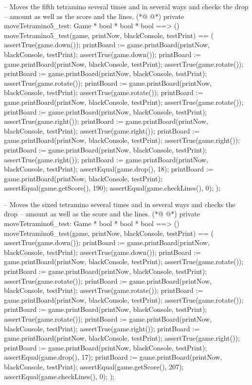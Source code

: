 \begin{vdmpp}[breaklines=true]
  -- Moves the fifth tetramino several times and in several ways and checks the drop
  -- amount as well as the score and the lines.
(*@
\label{moveTetramino5:test:394}
@*)
  private moveTetramino5_test: Game * bool * bool * bool ==> ()
  moveTetramino5_test(game, printNow, blackConsole, testPrint) == (
   assertTrue(game.down());
   printBoard := game.printBoard(printNow, blackConsole, testPrint);
   assertTrue(game.down());
   printBoard := game.printBoard(printNow, blackConsole, testPrint);
   assertTrue(game.rotate());
   printBoard := game.printBoard(printNow, blackConsole, testPrint);
   assertTrue(game.rotate());
   printBoard := game.printBoard(printNow, blackConsole, testPrint);
   assertTrue(game.rotate());
   printBoard := game.printBoard(printNow, blackConsole, testPrint);
   assertTrue(game.rotate());
   printBoard := game.printBoard(printNow, blackConsole, testPrint);
   assertTrue(game.right());
   printBoard := game.printBoard(printNow, blackConsole, testPrint);
   assertTrue(game.right());
   printBoard := game.printBoard(printNow, blackConsole, testPrint);
   assertTrue(game.right());
   printBoard := game.printBoard(printNow, blackConsole, testPrint);
   assertTrue(game.right());
   printBoard := game.printBoard(printNow, blackConsole, testPrint);
   assertEqual(game.drop(), 18);
   printBoard := game.printBoard(printNow, blackConsole, testPrint);
   assertEqual(game.getScore(), 190);
   assertEqual(game.checkLines(), 0);
  );
  
  -- Moves the sixed tetramino several times and in several ways and checks the drop
  -- amount as well as the score and the lines.
(*@
\label{moveTetramino6:test:424}
@*)
  private moveTetramino6_test: Game * bool * bool * bool ==> ()
  moveTetramino6_test(game, printNow, blackConsole, testPrint) == (
   assertTrue(game.down());
   printBoard := game.printBoard(printNow, blackConsole, testPrint);
   assertTrue(game.down());
   printBoard := game.printBoard(printNow, blackConsole, testPrint);
   assertTrue(game.rotate());
   printBoard := game.printBoard(printNow, blackConsole, testPrint);
   assertTrue(game.rotate());
   printBoard := game.printBoard(printNow, blackConsole, testPrint);
   assertTrue(game.rotate());
   printBoard := game.printBoard(printNow, blackConsole, testPrint);
   assertTrue(game.rotate());
   printBoard := game.printBoard(printNow, blackConsole, testPrint);
   assertTrue(game.rotate());
   printBoard := game.printBoard(printNow, blackConsole, testPrint);
   assertTrue(game.right());
   printBoard := game.printBoard(printNow, blackConsole, testPrint);
   assertTrue(game.right());
   printBoard := game.printBoard(printNow, blackConsole, testPrint);
   assertEqual(game.drop(), 17);
   printBoard := game.printBoard(printNow, blackConsole, testPrint);
   assertEqual(game.getScore(), 207);
   assertEqual(game.checkLines(), 0);
  );
  

\end{vdmpp}
